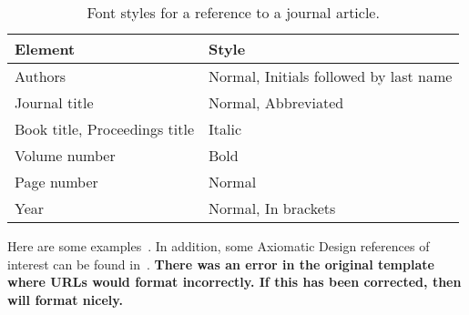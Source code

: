 \documentclass[twocolumn]{webofc}
\begin{document}
\begin{table}
  \centering
  \caption{Font styles for a reference to a journal article.}
  \label{tab:font-styles-reference-journal}
  \begin{tabular}{C{25mm}p{25mm}}\toprule
    \textbf{Element} &\textbf{Style}\\\midrule
    Authors &Normal, Initials followed by last name\\
    Journal title & Normal, Abbreviated\\
    Book title, Proceedings title & Italic\\
    Volume number &Bold\\
    Page number &Normal\\
    Year &Normal, In brackets\\
    \bottomrule
  \end{tabular}
\end{table}

Here are some examples~\cite{mecke2004deformability, rabha2012chemical, deluca2009progress, delillo2008sedimentation}.
In addition, some Axiomatic Design references of interest can be found in~\cite{cochran2016msdd, suh2005complexity, thompson2013classification}.  
\textbf{There was an error in the original template where URLs would format incorrectly.  
If this has been corrected, then \cite{bragason2015parachuterelease} will format nicely.}

%
% 

\end{document}
